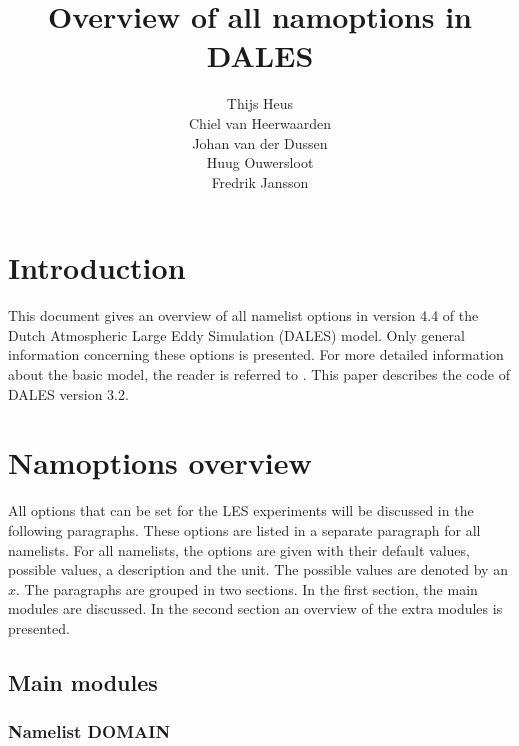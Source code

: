 \documentclass[twoside,11pt,fleqn,a4paper,english,openright]{report}
\begin{document}
 \begin{titlepage}
  \title{\textbf{Overview of all namoptions in DALES}}
  \author{Thijs Heus \\
  Chiel van Heerwaarden \\
  Johan van der Dussen \\
  Huug Ouwersloot\\
  Fredrik Jansson}
  \maketitle
 \end{titlepage}
\thispagestyle{empty}

\tableofcontents
{}
\chapter{Introduction}\label{chapter:introduction}

\setcounter{page}{1}
This document gives an overview of all namelist options in version 4.4 of the Dutch Atmospheric Large Eddy Simulation (DALES) model. Only general information concerning these options is presented. For more detailed information about the basic model, the reader is referred to \citet{Heus2009}. This paper describes the code of DALES version 3.2. 

\chapter{Namoptions overview}\label{chapter:namoptions}

All options that can be set for the LES experiments will be discussed in the following paragraphs. These options are listed in a separate paragraph for all namelists. For all namelists, the options are given with their default values, possible values, a description and the unit. The possible values are denoted by an $x$. The paragraphs are grouped in two sections. In the first section, the main modules are discussed. In the second section an overview of the extra modules is presented.

\section{Main modules}\label{par:mainmod}

\subsection{Namelist DOMAIN}\label{par:domain}
\end{document}
